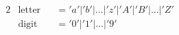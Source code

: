 \documentclass{article}
\begin{document}
\begin{alignat*}{2}
&\text{letter} &&= 'a' | 'b' | \dots | 'z' | 'A' | 'B' |\dots | 'Z' \\
&\text{digit} &&= '0' | '1' | \dots | '9'
\end{alignat*}
\end{document}
